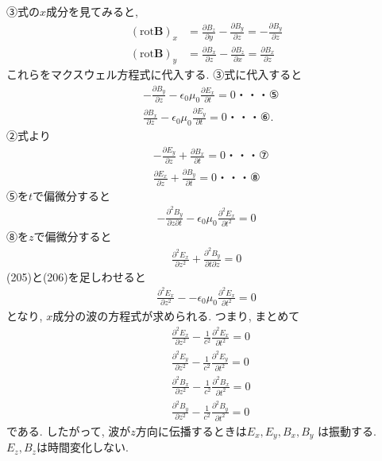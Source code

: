 \documentclass[a4paper,12pt]{jlreq}
\begin{document}
③式の$x$成分を見てみると, 
\begin{align}
  (\text{rot} \bm{B})_x &= \frac{\partial B_z}{\partial y} - \frac{\partial B_y}{\partial z} = -\frac{\partial B_y}{\partial z}\\
  (\text{rot} \bm{B})_y &= \frac{\partial B_x}{\partial z} - \frac{\partial B_z}{\partial x} = \frac{\partial B_x}{\partial z}
\end{align}
これらをマクスウェル方程式に代入する. ③式に代入すると
\begin{align}
  &-\frac{\partial B_y}{\partial z} - \epsilon_0 \mu_0 \frac{\partial E_x}{\partial t} = 0　・・・⑤\\
  &\frac{\partial B_x}{\partial z} - \epsilon_0 \mu_0 \frac{\partial E_y}{\partial t} = 0　・・・⑥.
\end{align}
②式より
\begin{align}
  &-\frac{\partial E_y}{\partial z} + \frac{\partial B_x}{\partial t} = 0　・・・⑦\\
  &\frac{\partial E_x}{\partial z} + \frac{\partial B_y}{\partial t} = 0　・・・⑧
\end{align}
⑤を$t$で偏微分すると
\begin{align}
  -\frac{\partial^2 B_y}{\partial z \partial t} - \epsilon_0 \mu_0 \frac{\partial^2 E_x}{\partial t^2} = 0
\end{align}
⑧を$z$で偏微分すると
\begin{align}
  \frac{\partial^2 E_x}{\partial z^2} + \frac{\partial^2 B_y}{\partial t \partial z} = 0
\end{align}
(205)と(206)を足しわせると
\begin{align}
  \frac{\partial^2 E_x}{\partial z^2} - - \epsilon_0 \mu_0 \frac{\partial^2 E_x}{\partial t^2} = 0
\end{align}
となり, $x$成分の波の方程式が求められる. つまり, まとめて
\begin{align}
  &\frac{\partial^2 E_x}{\partial z^2} - \frac{1}{c^2}\frac{\partial^2 E_x}{\partial t^2} = 0\\
  &\frac{\partial^2 E_y}{\partial z^2} - \frac{1}{c^2} \frac{\partial^2 E_y}{\partial t^2} = 0\\
  &\frac{\partial^2 B_x}{\partial z^2} - \frac{1}{c^2} \frac{\partial^2 B_x}{\partial t^2} = 0\\
  &\frac{\partial^2 B_y}{\partial z^2} - \frac{1}{c^2} \frac{\partial^2 B_y}{\partial t^2} = 0
\end{align}
である. したがって, 波が$z$方向に伝播するときは$E_x, E_y, B_x, B_y$
は振動する. $E_z, B_z$は時間変化しない. 
\end{document}
